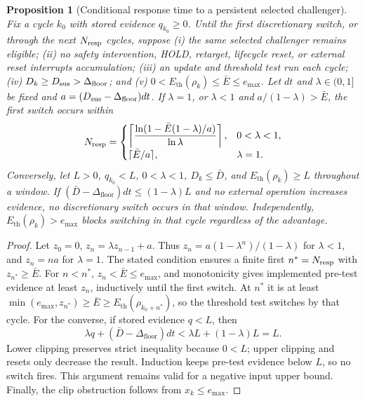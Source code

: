 \documentclass[11pt]{article}
\newtheorem{proposition}{Proposition}
\newcommand{\Dfloor}{\Delta_{\text{floor}}}
\newcommand{\Eth}{E_{\text{th}}}
\begin{document}
\begin{proposition}[Conditional response time to a persistent selected challenger] \label{prop:p2live}
Fix a cycle $k_0$ with stored evidence $q_{k_0}\ge0$. Until the first discretionary switch, or through the next $N_{\rm resp}$ cycles, suppose (i) the same selected challenger remains eligible; (ii) no safety intervention, HOLD, retarget, lifecycle reset, or external reset interrupts accumulation; (iii) an update and threshold test run each cycle; (iv) $D_k\ge D_{\rm sus}>\Dfloor$; and (v) $0<\Eth(\rho_k)\le\bar E\le e_{\max}$. Let $dt$ and $\lambda\in(0,1]$ be fixed and $a=(D_{\rm sus}-\Dfloor)dt$. If $\lambda=1$, or $\lambda<1$ and $a/(1-\lambda)>\bar E$, the first switch occurs within
\begin{equation}
N_{\rm resp}=\begin{cases}
\left\lceil\dfrac{\ln(1-\bar E(1-\lambda)/a)}{\ln\lambda}\right\rceil,&0<\lambda<1,\\
\lceil\bar E/a\rceil,&\lambda=1.
\end{cases}
\label{eq:nresp}
\end{equation}
Conversely, let $L>0$, $q_{k_0}<L$, $0<\lambda<1$, $D_k\le\bar D$, and $\Eth(\rho_k)\ge L$ throughout a window. If $(\bar D-\Dfloor)dt\le(1-\lambda)L$ and no external operation increases evidence, no discretionary switch occurs in that window. Independently, $\Eth(\rho_k)>e_{\max}$ blocks switching in that cycle regardless of the advantage.
\end{proposition}

\begin{proof}
Let $z_0=0$, $z_n=\lambda z_{n-1}+a$. Thus $z_n=a(1-\lambda^n)/(1-\lambda)$ for $\lambda<1$, and $z_n=na$ for $\lambda=1$. The stated condition ensures a finite first $n^*=N_{\rm resp}$ with $z_{n^*}\ge\bar E$. For $n<n^*$, $z_n<\bar E\le e_{\max}$, and monotonicity gives implemented pre-test evidence at least $z_n$, inductively until the first switch. At $n^*$ it is at least $\min(e_{\max},z_{n^*})\ge\bar E\ge\Eth(\rho_{k_0+n^*})$, so the threshold test switches by that cycle.
For the converse, if stored evidence $q<L$, then
\[
\lambda q+(\bar D-\Dfloor)dt<\lambda L+(1-\lambda)L=L.
\]
Lower clipping preserves strict inequality because $0<L$; upper clipping and resets only decrease the result. Induction keeps pre-test evidence below $L$, so no switch fires. This argument remains valid for a negative input upper bound. Finally, the clip obstruction follows from $x_k\le e_{\max}$.
\end{proof}
\end{document}
